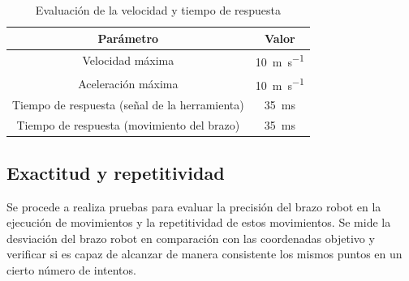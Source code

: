 \begin{table}[H]
\begin{center}
\begin{tabular}{|c|c|}
\hline
\textbf{Parámetro} & \textbf{Valor} \\
\hline
Velocidad máxima & \SI{10}{\meter\per\second}\\
Aceleración máxima & \SI{10}{\meter\per\second}\\
Tiempo de respuesta (señal de la herramienta) & \SI{35}{\milli\second} \\
Tiempo de respuesta (movimiento del brazo) & \SI{35}{\milli\second} \\
\hline
\end{tabular}
\caption{Evaluación de la velocidad y tiempo de respuesta}
\label{cuadro:evaluacion_velocidad}
\end{center}
\end{table}

\subsection{Exactitud y repetitividad} 
Se procede a realiza pruebas para evaluar la precisión del brazo robot en la ejecución de movimientos y la repetitividad 
de estos movimientos. Se mide la desviación del brazo robot en comparación con las coordenadas objetivo y verificar si 
es capaz de alcanzar de manera consistente los mismos puntos en un cierto número de intentos.

